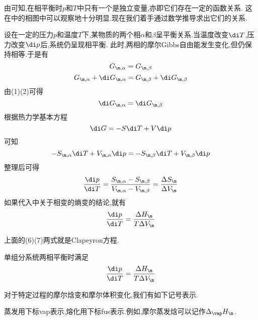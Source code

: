 \documentclass{ctexart}
\begin{document}
\vspace{8pt}
\indent 由可知,在相平衡时$p$和$T$中只有一个是独立变量,亦即它们存在一定的函数关系.%
这在中的相图中可以观察地十分明显.现在我们着手通过数学推导求出它们的关系.
\begin{derivation}\setcounter{equation}{0}
    设在一定的压力$p$和温度$T$下,某物质的两个相$\alpha$和$\beta$呈平衡关系.当温度改变$\di T$,压力改变$\di p$后,系统仍呈现相平衡.%
    此时,两相的摩尔Gibbs自由能发生变化,但仍保持相等.于是有
    \begin{equation}G_{\m,\alpha}=G_{\m,\beta}\end{equation}
    \begin{equation}G_{\m,\alpha}+\di G_{\m,\alpha}=G_{\m,\beta}+\di G_{\m,\beta}\end{equation}
    由(1)(2)可得
    \begin{equation}\di G_{\m,\alpha}=\di G_{\m,\beta}\end{equation}
    根据热力学基本方程
    \begin{equation}\di G=-S\di T+V\di p\end{equation}
    可知
    \begin{equation}-S_{\m,\alpha}\di T+V_{\m,\alpha}\di p=-S_{\m,\beta}\di T+V_{\m,\beta}\di p\end{equation}
    整理后可得
    \begin{equation}
        \dfrac{\di p}{\di T}=\dfrac{S_{\m,\alpha}-S_{\m,\beta}}{V_{\m,\alpha}-V_{\m,\beta}}=\dfrac{\Delta S_{\m}}{\Delta V_{\m}}
    \end{equation}
    如果代入中关于相变的熵变的结论,就有
    \begin{equation}
        \dfrac{\di p}{\di T}=\dfrac{\Delta H_{\m}}{T\Delta V_\m}
    \end{equation}

\end{derivation}
上面的(6)(7)两式就是Clapeyron方程.
\begin{theorem}[4A.3.1 Clapeyron方程]
    单组分系统两相平衡时满足
    \[\dfrac{\di p}{\di T}=\dfrac{\Delta H_{\m}}{T\Delta V_\m}\]

\end{theorem}
对于特定过程的摩尔焓变和摩尔体积变化,我们有如下记号表示.
\begin{definition}[4A.3.2 蒸发,熔化的符号表述]
    蒸发用下标vap表示,熔化用下标fus表示.例如,摩尔蒸发焓可以记作$\Delta_\vap H_\m$.
\end{definition}
\end{document}
